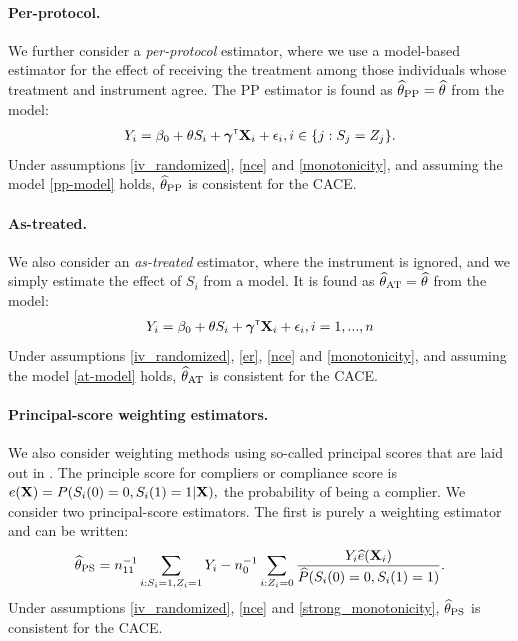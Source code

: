 \documentclass{article}
\def\spp{_{\text{PP}}}
\def\sat{_{\text{AT}}}
\def\sps{_{\text{PS}}}
\begin{document}
\paragraph{Per-protocol.} We further consider a \textit{per-protocol} estimator, where we use a model-based estimator for the effect of receiving the treatment among those individuals whose treatment and instrument agree. The PP estimator is found as $\thetahat\spp = \thetahat$ from the model:
\begin{align}
    Y_i = \beta_0 + \theta S_i + \boldsymbol{\gamma}^{{\sf \scriptscriptstyle{T}}}{\bf X}_i + \epsilon_i, i \in \{j : S_j = Z_j\}.\label{pp-model}
\end{align}
Under assumptions \ref{iv_randomized}, \ref{nce} and \ref{monotonicity}, and assuming the model \eqref{pp-model} holds, $\thetahat\spp$ is consistent for the CACE. 

\paragraph{As-treated.} We also consider an \textit{as-treated} estimator, where the instrument is ignored, and we simply estimate the effect of $S_i$ from a model. It is found as $\thetahat\sat = \thetahat$ from the model:
\begin{align}
    Y_i = \beta_0 + \theta S_i + \boldsymbol{\gamma}^{{\sf \scriptscriptstyle{T}}}{\bf X}_i + \epsilon_i, i = 1, ..., n \label{at-model}
\end{align}
Under assumptions \ref{iv_randomized}, \ref{er}, \ref{nce} and \ref{monotonicity}, and assuming the model \eqref{at-model} holds, $\thetahat\sat$ is consistent for the CACE.

\paragraph{Principal-score weighting estimators.} We also consider weighting methods using so-called principal scores that are laid out in \cite{Ding2017}. The principle score for compliers or compliance score is $e({\bf X}) = P(S_i(0) = 0, S_i(1) = 1 | {\bf X}),$ the probability of being a complier. We consider two principal-score estimators. The first is purely a weighting estimator and can  be written:
\begin{align}
    \thetahat\sps = n_{11}\inv\sum_{i : S_i = 1, Z_i = 1} Y_i - n_0\inv\sum_{i : Z_i = 0} \frac{Y_i\ehat(\bX_i)}{\Phat(S_i(0) = 0, S_i(1) = 1)}.
\end{align}
Under assumptions \ref{iv_randomized}, \ref{nce} and \ref{strong_monotonicity}, $\thetahat\sps$ is consistent for the CACE. 
\end{document}
